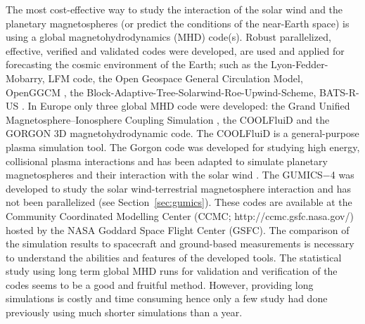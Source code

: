 \documentclass[linenumbers,draft]{agujournal}
\begin{document}
The most cost-effective way to study the interaction of the solar wind and the planetary magnetospheres (or predict the conditions of the near-Earth space) is using a global magnetohydrodynamics (MHD) code(s). Robust parallelized, effective, verified and validated codes were developed, are used and applied for forecasting the cosmic environment of the Earth; such as the Lyon-Fedder-Mobarry, LFM \citep{lyon04:_lyon_fedder_mobar_lfm_mhd} code, the Open Geospace General Circulation Model, OpenGGCM \citep{raeder08:_openg_simul_themis_mission}, the Block-Adaptive-Tree-Solarwind-Roe-Upwind-Scheme, BATS-R-US \citep{powell99:_solut_adapt_upwin_schem_ideal_magnet,toth12:_adapt}. In Europe only three global MHD code were developed: the Grand Unified Magnetosphere--Ionosphere Coupling Simulation \citep[GUMICS$-$4;][]{janhunen12:_gumic_mhd}, the COOLFluiD \citep{lani12:_coolf_open_comput_platf_aerot} and the GORGON 3D magnetohydrodynamic code. The COOLFluiD is a general-purpose plasma simulation tool. The Gorgon code was developed for studying high energy, collisional plasma interactions and has been adapted to simulate planetary magnetospheres and their interaction with the solar wind \citep{mejnertsen16:_global_mhd_neptun,mejnertsen18:_global_mhd_simul_earth_bow}. The GUMICS$-$4 was developed to study the solar wind-terrestrial magnetosphere interaction and has not been parallelized (see Section~\ref{sec:gumics}). These codes are available at the Community Coordinated Modelling Center (CCMC; http://ccmc.gsfc.nasa.gov/) hosted by the NASA Goddard Space Flight Center (GSFC). The comparison of the simulation results to spacecraft and ground-based measurements is necessary to understand the abilities and features of the developed tools. The statistical study using long term global MHD runs for validation and verification of the codes seems to be a good and fruitful method. However, providing long simulations is costly and time consuming hence only a few study had done previously using much shorter simulations than a year. 
\end{document}
